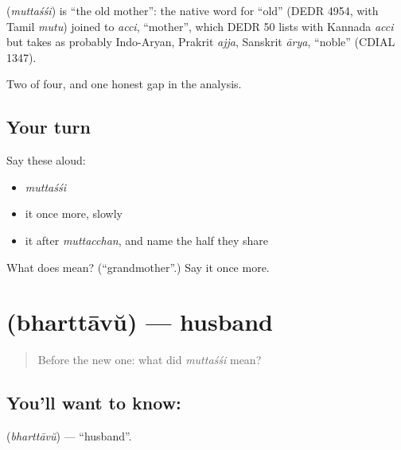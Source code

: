 \begin{cousinweb}
\textbf{} (\emph{muttaśśi}) is \textquotedblleft{}the old mother\textquotedblright{}: the native word for \textquotedblleft{}old\textquotedblright{} (DEDR 4954, with Tamil \emph{mutu}) joined to \emph{acci}, \textquotedblleft{}mother\textquotedblright{}, which DEDR 50 lists with Kannada \emph{acci} but takes as probably Indo-Aryan, Prakrit \emph{ajja}, Sanskrit \emph{ārya}, \textquotedblleft{}noble\textquotedblright{} (CDIAL 1347).
\end{cousinweb}

\begin{grammarlens}[title={What you've built}]
Two of four, and one honest gap in the analysis.
\end{grammarlens}

\subsection*{Your turn}
Say these aloud:

\begin{itemize}
\raggedright
  \item \emph{muttaśśi}
  \item it once more, slowly
  \item it after \emph{muttacchan}, and name the half they share
\end{itemize}

\begin{tcolorbox}[breakable,colback=teal!4,colframe=teal!35!black,title={Before you move on}]
What does  mean? (\textquotedblleft{}grandmother\textquotedblright{}.) Say it once more.
\end{tcolorbox}
\section[\texorpdfstring{\ml{ഭർത്താവ്} (bharttāvŭ)}{ഭർത്താവ് (bharttāvŭ)}]{ (bharttāvŭ) — husband}

\label{lesson:ML-C45-husband}



\begin{quote}
Before the new one: what did \emph{muttaśśi} mean?
\end{quote}

\subsection*{You'll want to know: }
\textbf{} (\emph{bharttāvŭ}) — \textquotedblleft{}husband\textquotedblright{}.


